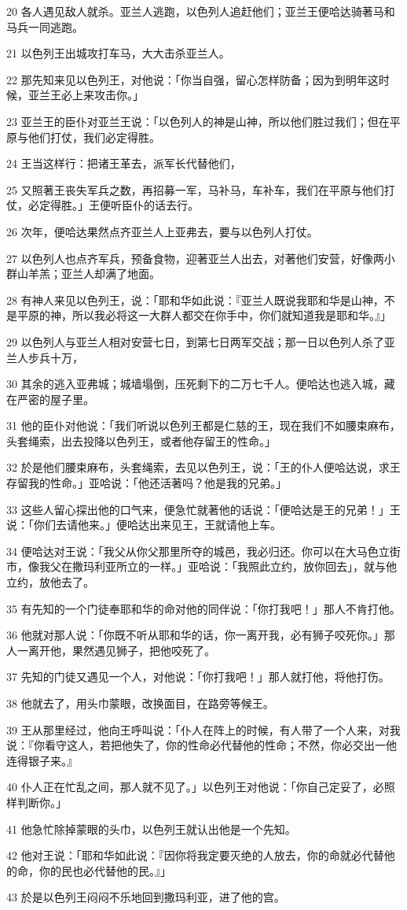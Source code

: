 \par 20 各人遇见敌人就杀。亚兰人逃跑，以色列人追赶他们；亚兰王便哈达骑著马和马兵一同逃跑。
\par 21 以色列王出城攻打车马，大大击杀亚兰人。
\par 22 那先知来见以色列王，对他说：「你当自强，留心怎样防备；因为到明年这时候，亚兰王必上来攻击你。」
\par 23 亚兰王的臣仆对亚兰王说：「以色列人的神是山神，所以他们胜过我们；但在平原与他们打仗，我们必定得胜。
\par 24 王当这样行：把诸王革去，派军长代替他们，
\par 25 又照著王丧失军兵之数，再招募一军，马补马，车补车，我们在平原与他们打仗，必定得胜。」王便听臣仆的话去行。
\par 26 次年，便哈达果然点齐亚兰人上亚弗去，要与以色列人打仗。
\par 27 以色列人也点齐军兵，预备食物，迎著亚兰人出去，对著他们安营，好像两小群山羊羔；亚兰人却满了地面。
\par 28 有神人来见以色列王，说：「耶和华如此说：『亚兰人既说我耶和华是山神，不是平原的神，所以我必将这一大群人都交在你手中，你们就知道我是耶和华。』」
\par 29 以色列人与亚兰人相对安营七日，到第七日两军交战；那一日以色列人杀了亚兰人步兵十万，
\par 30 其余的逃入亚弗城；城墙塌倒，压死剩下的二万七千人。便哈达也逃入城，藏在严密的屋子里。
\par 31 他的臣仆对他说：「我们听说以色列王都是仁慈的王，现在我们不如腰束麻布，头套绳索，出去投降以色列王，或者他存留王的性命。」
\par 32 於是他们腰束麻布，头套绳索，去见以色列王，说：「王的仆人便哈达说，求王存留我的性命。」亚哈说：「他还活著吗？他是我的兄弟。」
\par 33 这些人留心探出他的口气来，便急忙就著他的话说：「便哈达是王的兄弟！」王说：「你们去请他来。」便哈达出来见王，王就请他上车。
\par 34 便哈达对王说：「我父从你父那里所夺的城邑，我必归还。你可以在大马色立街市，像我父在撒玛利亚所立的一样。」亚哈说：「我照此立约，放你回去」，就与他立约，放他去了。
\par 35 有先知的一个门徒奉耶和华的命对他的同伴说：「你打我吧！」那人不肯打他。
\par 36 他就对那人说：「你既不听从耶和华的话，你一离开我，必有狮子咬死你。」那人一离开他，果然遇见狮子，把他咬死了。
\par 37 先知的门徒又遇见一个人，对他说：「你打我吧！」那人就打他，将他打伤。
\par 38 他就去了，用头巾蒙眼，改换面目，在路旁等候王。
\par 39 王从那里经过，他向王呼叫说：「仆人在阵上的时候，有人带了一个人来，对我说：『你看守这人，若把他失了，你的性命必代替他的性命；不然，你必交出一他连得银子来。』
\par 40 仆人正在忙乱之间，那人就不见了。」以色列王对他说：「你自己定妥了，必照样判断你。」
\par 41 他急忙除掉蒙眼的头巾，以色列王就认出他是一个先知。
\par 42 他对王说：「耶和华如此说：『因你将我定要灭绝的人放去，你的命就必代替他的命，你的民也必代替他的民。』」
\par 43 於是以色列王闷闷不乐地回到撒玛利亚，进了他的宫。

